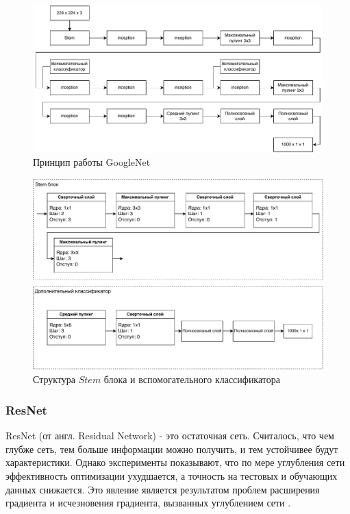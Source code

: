 \begin{figure}[H]
	\centering
	\includegraphics[width=\textwidth]{img/googlenet.pdf}
	\caption{Принцип работы GoogleNet}
	\label{fig:googlenet}
\end{figure}

\begin{figure}[H]
	\centering
	\includegraphics[width=\textwidth]{img/stem_aux.pdf}
	\caption{Структура $Stem$ блока и вспомогательного классификатора}
	\label{fig:stem_aux}
\end{figure}

\subsubsection{ResNet}
ResNet (от англ. Residual Network) - это остаточная сеть.  Считалось, что чем глубже сеть, тем больше информации можно получить, и тем устойчивее будут характеристики. Однако эксперименты показывают, что по мере углубления сети эффективность оптимизации ухудшается, а точность на тестовых и обучающих данных снижается. Это явление является результатом проблем расширения градиента и исчезновения градиента, вызванных углублением сети \cite{gradient_problem}.

